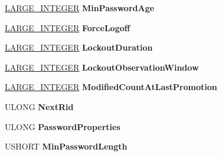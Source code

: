 \begin{DoxyCompactItemize}
\hyperlink{union___l_a_r_g_e___i_n_t_e_g_e_r}{L\+A\+R\+G\+E\+\_\+\+I\+N\+T\+E\+G\+ER} {\bfseries Min\+Password\+Age}
\item 
\mbox{\label{struct___s_a_m___d_o_m_a_i_n___f_i_x_e_d___d_a_t_a_aefd5083665f5b94929d238c5e6e7ee2b}} 
\hyperlink{union___l_a_r_g_e___i_n_t_e_g_e_r}{L\+A\+R\+G\+E\+\_\+\+I\+N\+T\+E\+G\+ER} {\bfseries Force\+Logoff}
\item 
\mbox{\label{struct___s_a_m___d_o_m_a_i_n___f_i_x_e_d___d_a_t_a_aa852cf7faf358327181c452f00e1ca89}} 
\hyperlink{union___l_a_r_g_e___i_n_t_e_g_e_r}{L\+A\+R\+G\+E\+\_\+\+I\+N\+T\+E\+G\+ER} {\bfseries Lockout\+Duration}
\item 
\mbox{\label{struct___s_a_m___d_o_m_a_i_n___f_i_x_e_d___d_a_t_a_a5f2ee2e40d4ff70a31af084ad8785f8b}} 
\hyperlink{union___l_a_r_g_e___i_n_t_e_g_e_r}{L\+A\+R\+G\+E\+\_\+\+I\+N\+T\+E\+G\+ER} {\bfseries Lockout\+Observation\+Window}
\item 
\mbox{\label{struct___s_a_m___d_o_m_a_i_n___f_i_x_e_d___d_a_t_a_ae074edfeacb3f7512a074354e03b4592}} 
\hyperlink{union___l_a_r_g_e___i_n_t_e_g_e_r}{L\+A\+R\+G\+E\+\_\+\+I\+N\+T\+E\+G\+ER} {\bfseries Modified\+Count\+At\+Last\+Promotion}
\item 
\mbox{\label{struct___s_a_m___d_o_m_a_i_n___f_i_x_e_d___d_a_t_a_a3d5f5fb0f54d09a5875135605050b806}} 
U\+L\+O\+NG {\bfseries Next\+Rid}
\item 
\mbox{\label{struct___s_a_m___d_o_m_a_i_n___f_i_x_e_d___d_a_t_a_af9711b78f73ddb6b0db94dc4ca38f6f6}} 
U\+L\+O\+NG {\bfseries Password\+Properties}
\item 
\mbox{\label{struct___s_a_m___d_o_m_a_i_n___f_i_x_e_d___d_a_t_a_ad45f3110560bf9d597d2827a932e383f}} 
U\+S\+H\+O\+RT {\bfseries Min\+Password\+Length}
\item 
\mbox{\label{struct___s_a_m___d_o_m_a_i_n___f_i_x_e_d___d_a_t_a_a45ca2452b6a01b2594764a28ba459aa9}} 

\end{DoxyCompactItemize}
